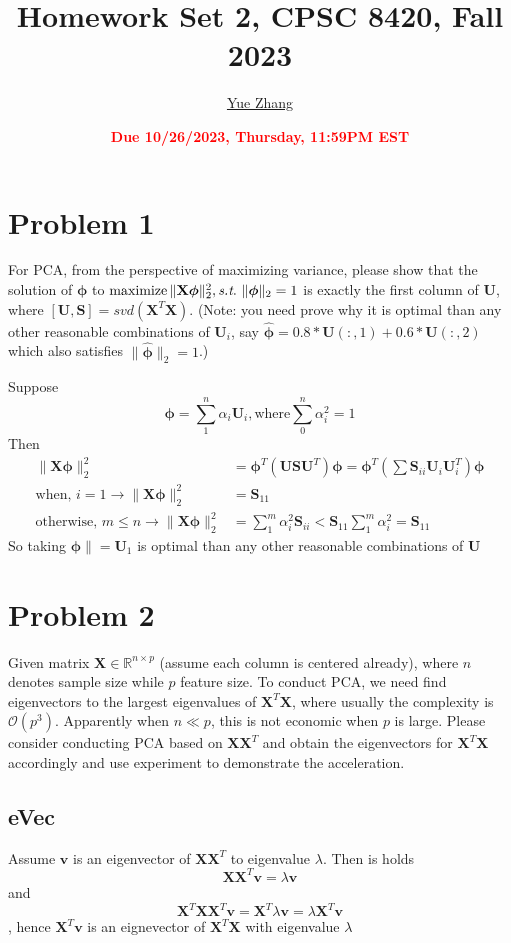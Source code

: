 \documentclass[11pt]{article}
\title{{\bf Homework Set 2, CPSC 8420, Fall 2023}} %
\author{\Large\underline{Yue Zhang}}
\date{\textbf{\Large\textcolor{red}{Due 10/26/2023, Thursday, 11:59PM EST}}} %
\newcommand{\R}{\mathbb{R}}
\newcommand{\maximize}{\operatorname*{maximize}}
\newcommand{\mtx}[1]{\mathbf{#1}}
\newcommand{\vct}[1]{\mathbf{#1}}
\def \mU {\mtx{U}}
\def \mS {\mtx{S}}
\def \mX {\mtx{X}}
\def \vv {\vct{v}}
\def \R {\mathbb{R}}
\begin{document}
	\maketitle
	

	\section{Problem 1}
	For PCA, from the perspective of maximizing variance, please show that the solution of 
	$\bm{\phi}$ to $\maximize \|\mX \bm{\phi}\|^2_2, \st \ \|\bm{\phi}\|_2=1$ 
	is exactly the first column of $\mU$, where $[\mU,\mS]=svd(\mX^T\mX)$. 
	(Note: you need prove why it is optimal than any other reasonable combinations of 
	$\mU_i$, say $\hat{\bm{\phi}}=0.8*\mU(:,1)+0.6*\mU(:,2)$ 
	which also  satisfies $\|\hat{\bm{\phi}}\|_2=1$.)
	
	\vspace{0.5cm}
	Suppose $$\bm{\phi} = \sum_{1}^{n}\alpha_i\mU_i, \text{where} \sum_{0}^{n}\alpha_i^2=1$$
	Then
	\begin{align}
		\|\mX \bm{\phi}\|^2_2 &= \bm{\phi}^T(\mU\mS\mU^T)\bm{\phi} = \bm{\phi}^T(\sum\mS_{ii}\mU_i\mU_i^T)\bm{\phi}\\
		\text{when, } i=1 \rightarrow \|\mX \bm{\phi}\|^2_2 &= \mS_{11}\\
		\text{otherwise, } m\leq n \rightarrow\|\mX \bm{\phi}\|^2_2 & = \sum_{1}^{m}\alpha_i^2 \mS_{ii}< \mS_{11}\sum_{1}^{m}\alpha_i^2 = \mS_{11}
	\end{align}
	So taking $\bm{\phi}\| = \mU_1$ is optimal than any other reasonable combinations of $\mU$


	\vspace{4cm}
	
	\section{Problem 2}
	Given matrix $\mX\in\R^{n\times p}$ (assume each column is centered already), where $n$ denotes sample size while $p$ feature size. To conduct PCA, we need find eigenvectors to the  largest eigenvalues of $\mX^T\mX$, where usually the complexity is $\mathcal{O}(p^3)$. Apparently when $n\ll p$, this is not economic when $p$ is large. Please consider conducting PCA based on $\mX\mX^T$ and obtain the eigenvectors for $\mX^T\mX$ accordingly and use experiment to demonstrate the acceleration.
	\vspace{0.5cm}
	
	\subsection{eVec}
	Assume $\vv$ is an eigenvector of $\mX\mX^T$ to eigenvalue $\lambda$. Then is holds $$\mX\mX^T\vv=\lambda\vv$$ and 
	$$\mX^T\mX\mX^T\vv=\mX^T\lambda\vv =\lambda\mX^T\vv$$, hence $\mX^T\vv$ is an eignevector of $\mX^T\mX$  with eigenvalue $\lambda$
\end{document}
